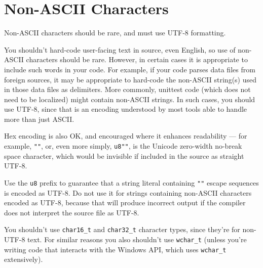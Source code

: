 
\section{Non-ASCII Characters}\label{sec:non-ascii-characters}
Non-ASCII characters should be rare, and must use UTF-8 formatting.

You shouldn't hard-code user-facing text in source, even English, so use of non-ASCII characters should be rare. However, in certain cases it is appropriate to include such words in your code. For example, if your code parses data files from foreign sources, it may be appropriate to hard-code the non-ASCII string(s) used in those data files as delimiters. More commonly, unittest code (which does not need to be localized) might contain non-ASCII strings. In such cases, you should use UTF-8, since that is an encoding understood by most tools able to handle more than just ASCII.

Hex encoding is also OK, and encouraged where it enhances readability — for example, \texttt{"\xEF\xBB\xBF"}, or, even more simply, \texttt{u8"\uFEFF"}, is the Unicode zero-width no-break space character, which would be invisible if included in the source as straight UTF-8.

Use the \texttt{u8} prefix to guarantee that a string literal containing \texttt{"\uXXXX"} escape sequences is encoded as UTF-8. Do not use it for strings containing non-ASCII characters encoded as UTF-8, because that will produce incorrect output if the compiler does not interpret the source file as UTF-8.

You shouldn't use \texttt{char16_t} and \texttt{char32_t} character types, since they're for non-UTF-8 text. For similar reasons you also shouldn't use \texttt{wchar_t} (unless you're writing code that interacts with the Windows API, which uses \texttt{wchar_t} extensively).
